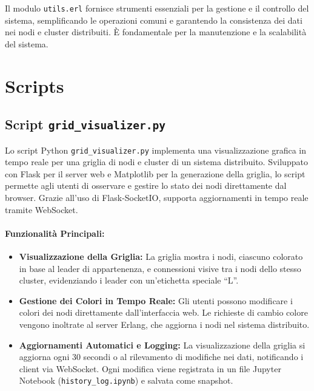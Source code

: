 \documentclass[12pt, a4paper]{report}
\begin{document}
\noindent
Il modulo \texttt{utils.erl} fornisce strumenti essenziali per la gestione e il controllo del sistema, semplificando le operazioni comuni e garantendo la consistenza dei dati nei nodi e cluster distribuiti. È fondamentale per la manutenzione e la scalabilità del sistema.


\section{Scripts}\label{sec:scripts}

\subsection{Script \texttt{grid\_visualizer.py}}

Lo script Python \texttt{grid\_visualizer.py} implementa una visualizzazione grafica in tempo reale per una griglia di nodi e cluster di un sistema distribuito. Sviluppato con Flask per il server web e Matplotlib per la generazione della griglia, lo script permette agli utenti di osservare e gestire lo stato dei nodi direttamente dal browser. Grazie all'uso di Flask-SocketIO, supporta aggiornamenti in tempo reale tramite WebSocket.

\paragraph{Funzionalità Principali:}
\begin{itemize}
    \item \textbf{Visualizzazione della Griglia:} La griglia mostra i nodi, ciascuno colorato in base al leader di appartenenza, e connessioni visive tra i nodi dello stesso cluster, evidenziando i leader con un'etichetta speciale ``L''.
    \item \textbf{Gestione dei Colori in Tempo Reale:} Gli utenti possono modificare i colori dei nodi direttamente dall'interfaccia web. Le richieste di cambio colore vengono inoltrate al server Erlang, che aggiorna i nodi nel sistema distribuito.
    \item \textbf{Aggiornamenti Automatici e Logging:} La visualizzazione della griglia si aggiorna ogni 30 secondi o al rilevamento di modifiche nei dati, notificando i client via WebSocket. Ogni modifica viene registrata in un file Jupyter Notebook (\texttt{history\_log.ipynb}) e salvata come snapshot.
\end{itemize}
\end{document}

